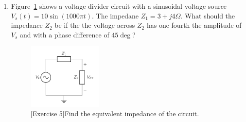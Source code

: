 \begin{enumerate}
    \item Figure~\ref{fig:ex02-05} shows a voltage divider circuit with a sinusoidal voltage source $V_s\left(t\right) = 10 \sin\left(1000\pi t\right)$. The impedane $Z_1 = 3 + j4 \Omega$. What should the impedance $Z_2$ be if the the voltage across $Z_2$ has one-fourth the amplitude of $V_s$ and with a phase difference of $45\deg$?
    \begin{figure}[h]
        \centering
        \includegraphics[width=0.35\textwidth]{figure/ch02/ex02-05.pdf}
        \caption{[Exercise 5]Find the equivalent impedance of the circuit.}
        \label{fig:ex02-05}
    \end{figure}
\end{enumerate}